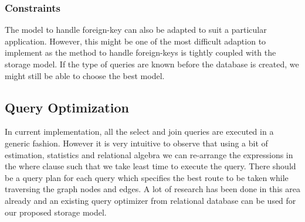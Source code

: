 \documentclass[12pt, oneside]{book}
\begin{document}
\subsubsection{Constraints}
The model to handle foreign-key can also be adapted to suit a particular application. However, this might be one of the most difficult adaption to implement as the method to handle foreign-keys is tightly coupled with the storage model. If the type of queries are known before the database is created, we might still be able to choose the best model.
\subsection{Query Optimization}
In current implementation, all the select and join queries are executed in a generic fashion. However it is very intuitive to observe that using a bit of estimation, statistics and relational algebra we can re-arrange the expressions in the where clause such that we take least time to execute the query. There should be a query plan for each query which specifies the best route to be taken while traversing the graph nodes and edges. A lot of research has been done in this area already and an existing query optimizer from relational database can be used for our proposed storage model.

\pagebreak


%
%
\end{document}
